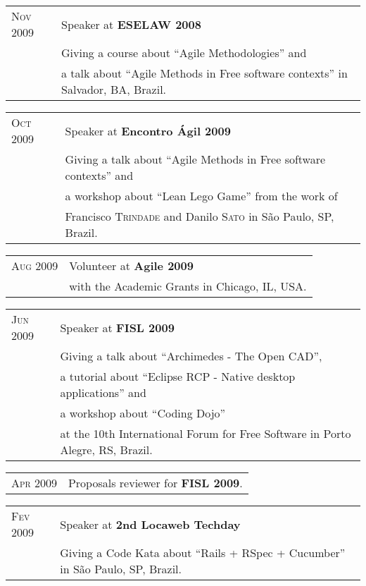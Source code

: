\documentclass[letter,10pt]{article}
\begin{document}
\begin{tabular}{p{2.5cm}l}
  \textsc{Nov 2009} & Speaker at \textbf{ESELAW 2008}\\
  &Giving a course about ``Agile Methodologies'' and\\
  &a talk about ``Agile Methods in Free software contexts'' in Salvador, BA, Brazil.\\
\end{tabular}

\begin{tabular}{p{2.5cm}l}
  \textsc{Oct 2009} & Speaker at \textbf{Encontro Ágil 2009}\\
  &Giving a talk about ``Agile Methods in Free software contexts'' and\\
  &a workshop about ``Lean Lego Game'' from the work of\\
  &Francisco \textsc{Trindade} and Danilo \textsc{Sato} in São Paulo, SP, Brazil.\\
\end{tabular}

\begin{tabular}{p{2.5cm}l}
  \textsc{Aug 2009} & Volunteer at \textbf{Agile 2009}\\
  & with the Academic Grants in Chicago, IL, USA.\\
\end{tabular}

\begin{tabular}{p{2.5cm}l}
  \textsc{Jun 2009} & Speaker at \textbf{FISL 2009}\\
  &Giving a talk about ``Archimedes - The Open CAD'',\\
  & a tutorial about ``Eclipse RCP - Native desktop applications'' and\\
  & a workshop about ``Coding Dojo''\\
  & at the 10th International Forum for Free Software in Porto
  Alegre, RS, Brazil.
\end{tabular}

\begin{tabular}{p{2.5cm}l}
  \textsc{Apr 2009} & Proposals reviewer for \textbf{FISL 2009}.\\
\end{tabular}

\begin{tabular}{p{2.5cm}l}
  \textsc{Fev 2009} & Speaker at \textbf{2nd Locaweb Techday}\\
  & Giving a Code Kata about ``Rails + RSpec + Cucumber'' in São Paulo, SP, Brazil.\\
\end{tabular}
\end{document}

